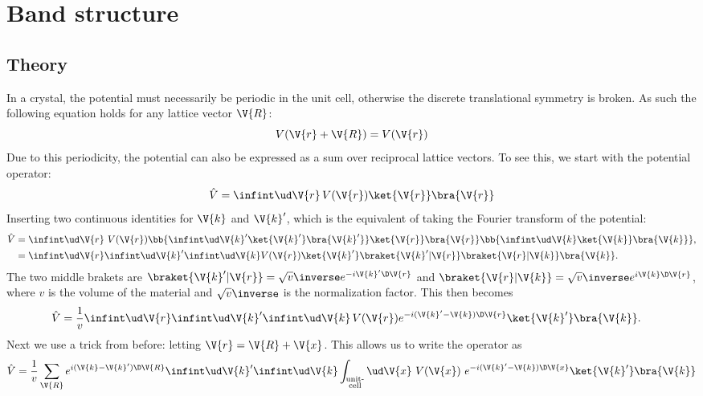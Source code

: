\documentclass[main.tex]{subfiles}
\begin{document}
	
	\section{Band structure}
	\subsection{Theory}
	In a crystal, the potential must necessarily be periodic in the unit cell, otherwise the discrete translational symmetry is broken. As such the following equation holds for any lattice vector $ \V{R} $:
	\begin{equation}\label{eq:band_period_V}
		V(\V{r}+\V{R}) = V(\V{r})
	\end{equation}
	Due to this periodicity, the potential can also be expressed as a sum over reciprocal lattice vectors. To see this, we start with the potential operator:
	\begin{equation}
		\hat{V} = \infint \ud \V{r} \, V(\V{r}) \ket{\V{r}}\bra{\V{r}}
	\end{equation}
	Inserting two continuous identities for $ \V{k} $ and $ \V{k}' $, which is the equivalent of taking the Fourier transform of the potential: 
	\begin{align}
		\hat{V} &= \infint \ud \V{r}\ V(\V{r}) \bb{\infint \ud \V{k}' \ket{\V{k}'} \bra{\V{k}'}} \ket{\V{r}}\bra{\V{r}} \bb{\infint \ud \V{k} \ket{\V{k}} \bra{\V{k}}}, \\
		&= \infint \ud\V{r} \infint \ud \V{k}' \infint \ud \V{k} V(\V{r}) \ket{\V{k}'} \braket{\V{k}' | \V{r}} \braket{\V{r} | \V{k}} \bra{\V{k}}.
	\end{align}
	The two middle brakets are $ \braket{\V{k}'| \V{r}}= \sqrt{v}\inverse e^{-i \V{k}' \D \V{r}} $ and $ \braket{\V{r} | \V{k}} = \sqrt{v}\inverse e^{i \V{k} \D \V{r}} $,  where $ v $ is the volume of the material and $ \sqrt{v}\inverse $ is the normalization factor. This then becomes
	\begin{align}
		\hat{V} &= \frac{1}{v} \infint \ud\V{r} \infint \ud \V{k}' \infint \ud \V{k}\, V(\V{r}) e^{-i(\V{k}'-\V{k}) \D \V{r}} \ket{\V{k}'} \bra{\V{k}}.
	\end{align}
	Next we use a trick from before: letting $ \V{r} = \V{R} + \V{x} $. This allows us to write the operator as
	\begin{equation}
		\hat{V} = \frac{1}{v} \sum_{\V{R}} e^{i(\V{k}-\V{k}') \D \V{R}} \infint \ud \V{k}' \infint \ud \V{k} \int_{\substack{\text{unit-} \\\text{cell}}} \ud \V{x}\ V(\V{x})\  e^{-i (\V{k}'-\V{k}) \D \V{x}} \ket{\V{k}'} \bra{\V{k}}
	\end{equation}
\end{document}
